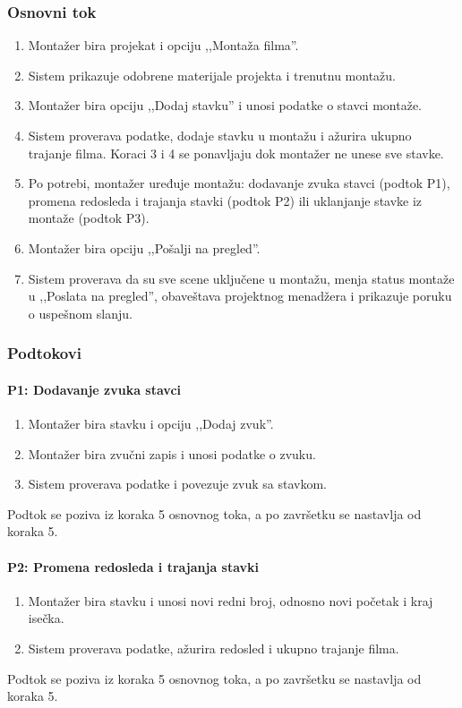 \subsubsection*{Osnovni tok}
\begin{enumerate}
    \item Montažer bira projekat i opciju ,,Montaža filma''.
    \item Sistem prikazuje odobrene materijale projekta i trenutnu montažu.
    \item Montažer bira opciju ,,Dodaj stavku'' i unosi podatke o stavci montaže.
    \item Sistem proverava podatke, dodaje stavku u montažu i ažurira ukupno trajanje filma. Koraci 3 i 4 se ponavljaju dok montažer ne unese sve stavke.
    \item Po potrebi, montažer uređuje montažu: dodavanje zvuka stavci (podtok P1), promena redosleda i trajanja stavki (podtok P2) ili uklanjanje stavke iz montaže (podtok P3).
    \item Montažer bira opciju ,,Pošalji na pregled''.
    \item Sistem proverava da su sve scene uključene u montažu, menja status montaže u ,,Poslata na pregled'', obaveštava projektnog menadžera i prikazuje poruku o uspešnom slanju.
\end{enumerate}

\subsubsection*{Podtokovi}

\paragraph*{P1: Dodavanje zvuka stavci}
\begin{enumerate}
    \item Montažer bira stavku i opciju ,,Dodaj zvuk''.
    \item Montažer bira zvučni zapis i unosi podatke o zvuku.
    \item Sistem proverava podatke i povezuje zvuk sa stavkom.
\end{enumerate}
Podtok se poziva iz koraka 5 osnovnog toka, a po završetku se nastavlja od koraka 5.

\paragraph*{P2: Promena redosleda i trajanja stavki}
\begin{enumerate}
    \item Montažer bira stavku i unosi novi redni broj, odnosno novi početak i kraj isečka.
    \item Sistem proverava podatke, ažurira redosled i ukupno trajanje filma.
\end{enumerate}
Podtok se poziva iz koraka 5 osnovnog toka, a po završetku se nastavlja od koraka 5.

